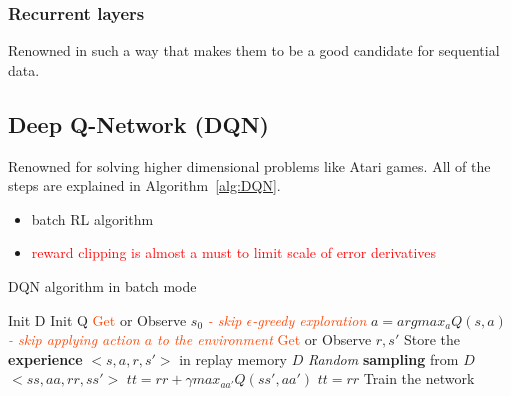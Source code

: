 \documentclass[a4paper,12pt]{article}
\begin{document}
\subsubsection{Recurrent layers}
Renowned in such a way that makes them to be a good candidate for sequential data.


\subsection{Deep Q-Network (DQN)}
Renowned for solving higher dimensional problems like Atari games. All of the steps are explained in Algorithm~\ref{alg:DQN}.

\begin{itemize}
    \item batch RL algorithm
    \item \textcolor{red}{reward clipping is almost a must to limit scale of error derivatives} \cite{Francois-Lavet2018}
\end{itemize}

\begin{algorithm}[H]
\caption{DQN algorithm in batch mode}
\label{alg:DQN}
\begin{algorithmic}[1]
    \State Init D \Comment{\textcolor{BlueViolet}{replay memory}}
    \State Init Q \Comment{\textcolor{BlueViolet}{Q-table w/ random weights}}
    \State \textcolor{OrangeRed}{Get} or Observe $s_0$ \Comment{\textcolor{BlueViolet}{the initial state}}
            \State \textit{\textcolor{OrangeRed}{- skip $\epsilon$-greedy exploration}}
            \State $a = argmax_a Q(s,a)$
            \State \textit{\textcolor{OrangeRed}{- skip applying action $a$ to the environment}}
            \State \textcolor{OrangeRed}{Get} or Observe $r, s'$
            \State Store the \textbf{experience} $<s, a, r, s'>$ in replay memory $D$
            \State \textit{Random} \textbf{sampling} from $D$ $<ss, aa, rr, ss'>$  \Comment{\textcolor{BlueViolet}{[mini]-batch}}
             \Comment{\textcolor{BlueViolet}{target for each mini-batch}}
                \State $tt = rr + \gamma max_{aa'} Q(ss', aa')$
            \Else
                \State $tt = rr$
            \EndIf
            \State Train the network
        \EndFor    
    \EndFor
\end{algorithmic}
\end{algorithm}
\end{document}
